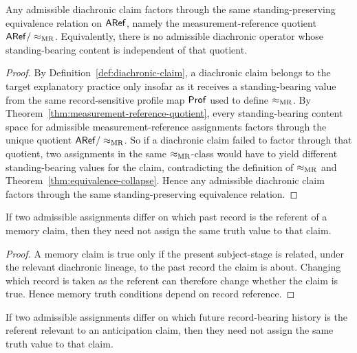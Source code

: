 \begin{theorem}
\label{thm:diachronic-closure}
Any admissible diachronic claim factors through the same standing-preserving equivalence relation on
$\mathsf{ARef}$, namely the measurement-reference quotient $\mathsf{ARef}/\mathrel{\approx_{\mathrm{MR}}}$. Equivalently, there is no
admissible diachronic operator whose standing-bearing content is independent of that quotient.
\end{theorem}

\begin{proof}
By Definition~\ref{def:diachronic-claim}, a diachronic claim belongs to the target explanatory
practice only insofar as it receives a standing-bearing value from the same record-sensitive profile map
$\mathsf{Prof}$ used to define $\mathrel{\approx_{\mathrm{MR}}}$. By Theorem~\ref{thm:measurement-reference-quotient}, every
standing-bearing content space for admissible measurement-reference assignments factors through the
unique quotient $\mathsf{ARef}/\mathrel{\approx_{\mathrm{MR}}}$. So if a diachronic claim failed to factor through that quotient, two
assignments in the same $\mathrel{\approx_{\mathrm{MR}}}$-class would have to yield different standing-bearing values for the
claim, contradicting the definition of $\mathrel{\approx_{\mathrm{MR}}}$ and Theorem~\ref{thm:equivalence-collapse}. Hence
any admissible diachronic claim factors through the same standing-preserving equivalence relation.
\end{proof}

\begin{lemma}
\label{lem:memory-depends}
If two admissible assignments differ on which past record is the referent of a memory claim, then they
need not assign the same truth value to that claim.
\end{lemma}

\begin{proof}
A memory claim is true only if the present subject-stage is related, under the relevant diachronic
lineage, to the past record the claim is about. Changing which record is taken as the referent can
therefore change whether the claim is true. Hence memory truth conditions depend on record
reference.
\end{proof}

\begin{lemma}
\label{lem:anticipation-depends}
If two admissible assignments differ on which future record-bearing history is the referent relevant to
an anticipation claim, then they need not assign the same truth value to that claim.
\end{lemma}


